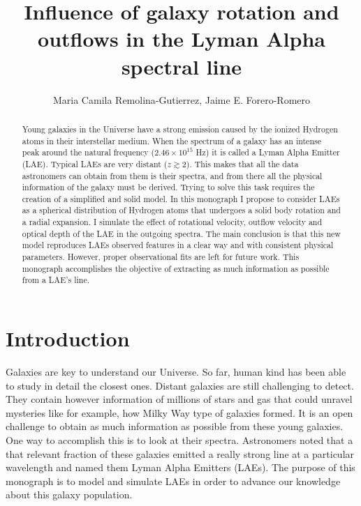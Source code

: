 \documentclass{latex/emulateapj}
\begin{document}
\title{Influence of galaxy rotation and outflows in the Lyman Alpha spectral line}


\author{Maria Camila Remolina-Gutierrez, Jaime E. Forero-Romero} 


\begin{abstract}
\noindent Young galaxies in the Universe have a strong \lya emission caused by the ionized Hydrogen atoms in their interstellar medium. When the spectrum of a galaxy has an intense peak around the \lya natural frequency ($2.46\times 10^{15}$ Hz) it is called a Lyman Alpha Emitter (LAE). Typical LAEs are very distant ($z \gtrsim 2$). This makes that all the data astronomers can obtain from them is their spectra, and from there all the physical information of the galaxy must be derived. Trying to solve this task requires the creation of a simplified and solid model. In this monograph I propose to consider LAEs as a spherical distribution of Hydrogen atoms that undergoes a solid body rotation and a radial expansion. I simulate the effect of rotational velocity, outflow velocity and optical depth of the LAE in the outgoing spectra. The main conclusion is that this new model reproduces LAEs observed features in a clear way and with consistent physical parameters. However, proper observational fits are left for future work. This monograph accomplishes the objective of extracting as much information as possible from a LAE's \lya line.
\end{abstract}

\section{Introduction}
\label{sec:intro}

Galaxies are key to understand our Universe. So far, human kind has been able to study in detail the closest ones. Distant galaxies are still challenging to detect. They contain however information of millions of stars and gas that could unravel mysteries like for example, how Milky Way type of galaxies formed. It is an open challenge to obtain as much information as possible from these young galaxies. One way to accomplish this is to look at their spectra. Astronomers noted that a that relevant fraction of these galaxies emitted a really strong line at a particular wavelength and named them Lyman Alpha Emitters (LAEs). The purpose of this monograph is to model and simulate LAEs in order to advance our knowledge about this galaxy population. \\
\end{document}
